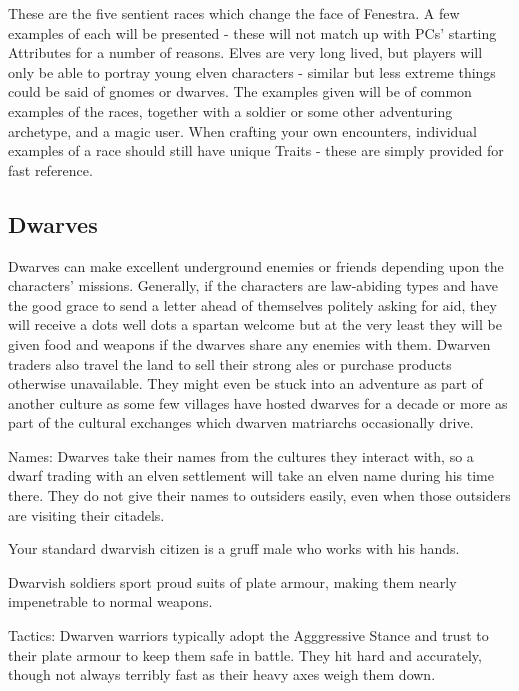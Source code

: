 \begin{multicols}{2}

These are the five sentient races which change the face of Fenestra.  A few examples of each will be presented - these will not match up with PCs' starting Attributes for a number of reasons.  Elves are very long lived, but players will only be able to portray young elven characters - similar but less extreme things could be said of gnomes or dwarves.  The examples given will be of common examples of the races, together with a soldier or some other adventuring archetype, and a magic user.  When crafting your own encounters, individual examples of a race should still have unique Traits - these are simply provided for fast reference.

\subsection{Dwarves}

Dwarves can make excellent underground enemies or friends depending upon the characters' missions.  Generally, if the characters are law-abiding types and have the good grace to send a letter ahead of themselves politely asking for aid, they will receive a dots well dots a spartan welcome but at the very least they will be given food and weapons if the dwarves share any enemies with them.  Dwarven traders also travel the land to sell their strong ales or purchase products otherwise unavailable.  They might even be stuck into an adventure as part of another culture as some few villages have hosted dwarves for a decade or more as part of the cultural exchanges which dwarven matriarchs occasionally drive.

	Names: Dwarves take their names from the cultures they interact with, so a dwarf trading with an elven settlement will take an elven name during his time there.  They do not give their names to outsiders easily, even when those outsiders are visiting their citadels.

\label{dwarven_trader}

Your standard dwarvish citizen is a gruff male who works with his hands.

\dwarventrader

\label{dwarven_soldier}

Dwarvish soldiers sport proud suits of plate armour, making them nearly impenetrable to normal weapons.

\dwarvensoldier
	Tactics: Dwarven  warriors typically adopt the Agggressive Stance and trust to their plate armour to keep them safe in battle.  They hit hard and accurately, though not always terribly fast as their heavy axes weigh them down.


\end{multicols}
